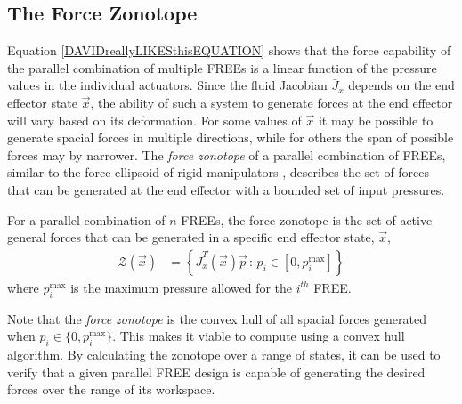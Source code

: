 \subsection{The Force Zonotope}
Equation \eqref{DAVIDreallyLIKESthisEQUATION} shows that the force capability of the parallel combination of multiple FREEs is a linear function of the pressure values in the individual actuators.
Since the fluid Jacobian $\bar{J}_{x}$ depends on the end effector state $\vec{x}$, the ability of such a system to generate forces at the end effector will vary based on its deformation.
For some values of $\vec{x}$ it may be possible to generate spacial forces in multiple directions, while for others the span of possible forces may by narrower. 
The \emph{force zonotope} of a parallel combination of FREEs, similar to the force ellipsoid of rigid manipulators \cite{spong2008robot}, describes the set of forces that can be generated at the end effector with a bounded set of input pressures.

\begin{definition}
    For a parallel combination of $n$ FREEs, the force zonotope is the set of active general 
    forces that can be generated in a specific end effector state, $\vec{x}$,
    \begin{align}
        \mathcal{Z}(\vec{x}) &= \left\{\bar{J}^T_x (\vec{x}) \vec{p} \, : \, p_i \in [0,p_i^\text{max}] \right\}     \label{eq:zonotope}
    \end{align}
    where $p_i^{\text{max}}$ is the maximum pressure allowed for the $i^{th}$ FREE.
\end{definition}

Note that the \emph{force zonotope} is the convex hull of all spacial forces generated when $p_i \in \{0, p_i^{\text{max}}\}$.
This makes it viable to compute using a convex hull algorithm. By calculating the zonotope over a range of states, it can be used to verify that a given parallel FREE design is capable of generating the desired forces over the range of its workspace. 


